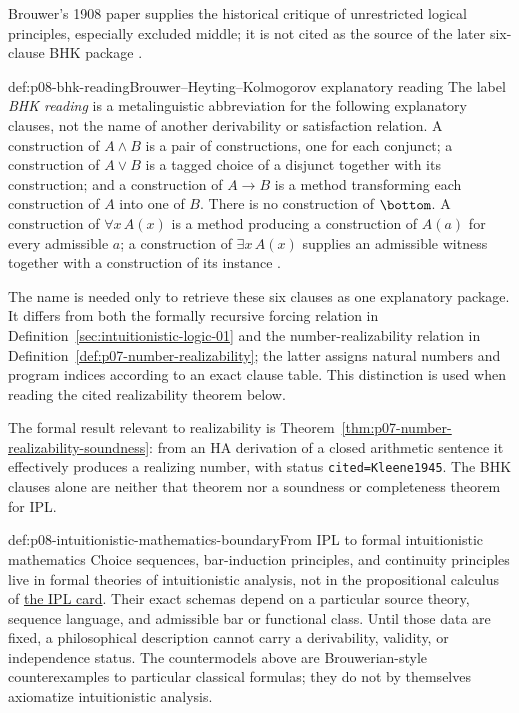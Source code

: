 Brouwer's 1908 paper supplies the historical critique of unrestricted logical
principles, especially excluded middle; it is not cited as the source of the
later six-clause BHK package \cite{Brouwer1908}.

\begin{hbdefinition}{def:p08-bhk-reading}{Brouwer--Heyting--Kolmogorov explanatory reading}
The label \emph{BHK reading} is a metalinguistic abbreviation for the
following explanatory clauses, not the name of another derivability or
satisfaction relation.  A construction of \(A\land B\) is a pair of
constructions, one for each conjunct; a construction of \(A\lor B\) is a
tagged choice of a disjunct together with its construction; and a construction
of \(A\to B\) is a method transforming each construction of \(A\) into one of
\(B\).  There is no construction of \(\bottom\).  A construction of
\(\forall x\,A(x)\) is a method producing a construction of \(A(a)\) for every
admissible \(a\); a construction of \(\exists x\,A(x)\) supplies an admissible
witness together with a construction of its instance
\cite{Heyting1956,TroelstraVanDalen1988}.

The name is needed only to retrieve these six clauses as one explanatory
package.  It differs from both the formally recursive forcing relation in
Definition~\ref{sec:intuitionistic-logic-01} and the number-realizability relation in
Definition~\ref{def:p07-number-realizability}; the latter assigns natural
numbers and program indices according to an exact clause table.  This
distinction is used when reading the cited realizability theorem below.
\end{hbdefinition}

The formal result relevant to realizability is
Theorem~\ref{thm:p07-number-realizability-soundness}: from an HA derivation of
a closed arithmetic sentence it effectively produces a realizing number, with
status \texttt{cited=Kleene1945}.  The BHK clauses alone are neither that
theorem nor a soundness or completeness theorem for IPL.

\begin{proofboundary}{def:p08-intuitionistic-mathematics-boundary}{From IPL to formal intuitionistic mathematics}
Choice sequences, bar-induction principles, and continuity principles live in
formal theories of intuitionistic analysis, not in the propositional calculus
of \hyperref[entry:p08-ipl]{the IPL card}.  Their exact schemas depend on a
particular source theory, sequence language, and admissible bar or functional
class.  Until those data are fixed, a philosophical description cannot carry
a derivability, validity, or independence status.  The countermodels above
are Brouwerian-style counterexamples to particular classical formulas; they do
not by themselves axiomatize intuitionistic analysis.
\end{proofboundary}

